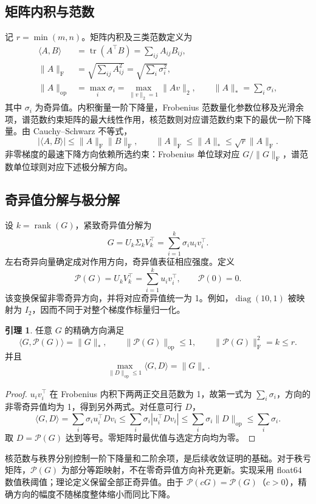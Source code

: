 \documentclass[11pt,a4paper]{article}
\theoremstyle{definition}
\newtheorem{lemma}{引理}
\newcommand{\F}{\mathrm{F}}
\newcommand{\op}{\mathrm{op}}
\newcommand{\Pol}{\mathcal{P}}
\begin{document}
\subsection{矩阵内积与范数}
记 $r=\min(m,n)$。矩阵内积及三类范数定义为
\begin{align}
 \langle A,B\rangle&=\operatorname{tr}(A^\top B)=\sum_{ij}A_{ij}B_{ij},\\
 \|A\|_\F&=\sqrt{\sum_{ij}A_{ij}^2}=\sqrt{\sum_i\sigma_i^2},\\
 \|A\|_\op&=\max_i\sigma_i=\max_{\|v\|_2=1}\|Av\|_2,\qquad
 \|A\|_*=\sum_i\sigma_i,
\end{align}
其中 $\sigma_i$ 为奇异值。内积衡量一阶下降量，Frobenius 范数量化参数位移及光滑余项，谱范数约束矩阵的最大线性作用，核范数则对应谱范数约束下的最优一阶下降量。由 Cauchy--Schwarz 不等式，
\begin{equation}
 |\langle A,B\rangle|\le\|A\|_\F\|B\|_\F,
 \qquad \|A\|_\F\le\|A\|_*\le\sqrt r\|A\|_\F.
 \label{eq:norms}
\end{equation}
非零梯度的最速下降方向依赖所选约束：Frobenius 单位球对应 $G/\|G\|_\F$，谱范数单位球则对应下述极分解方向。

\subsection{奇异值分解与极分解}
设 $k=\operatorname{rank}(G)$，紧致奇异值分解为
\[
 G=U_k\Sigma_kV_k^\top=\sum_{i=1}^k\sigma_i u_iv_i^\top.
\]
左右奇异向量确定成对作用方向，奇异值表征相应强度。定义
\begin{equation}
 \Pol(G)=U_kV_k^\top=\sum_{i=1}^k u_iv_i^\top,\qquad \Pol(0)=0.
 \label{eq:polar}
\end{equation}
该变换保留非零奇异方向，并将对应奇异值统一为 1。例如，$\operatorname{diag}(10,1)$ 被映射为 $I_2$，因而不同于对整个梯度作标量归一化。

\begin{lemma}
任意 $G$ 的精确方向满足
\begin{equation}
 \langle G,\Pol(G)\rangle=\|G\|_*,\qquad
 \|\Pol(G)\|_\op\le1,\qquad
 \|\Pol(G)\|_\F^2=k\le r.
 \label{eq:polar-identities}
\end{equation}
并且
\begin{equation}
 \max_{\|D\|_\op\le1}\langle G,D\rangle=\|G\|_*.
 \label{eq:duality}
\end{equation}
\end{lemma}
\begin{proof}
$u_i v_i^\top$ 在 Frobenius 内积下两两正交且范数为 1，故第一式为 $\sum_i\sigma_i$，方向的非零奇异值均为 1，得到另外两式。对任意可行 $D$，
\[
 \langle G,D\rangle=\sum_i\sigma_i u_i^\top Dv_i
 \le\sum_i\sigma_i|u_i^\top Dv_i|
 \le\sum_i\sigma_i\|D\|_\op\le\sum_i\sigma_i.
\]
取 $D=\Pol(G)$ 达到等号。零矩阵时最优值与选定方向均为零。
\end{proof}
核范数与秩界分别控制一阶下降量和二阶余项，是后续收敛证明的基础。对于秩亏矩阵，$\Pol(G)$ 为部分等距映射，不在零奇异值方向补充更新。实现采用 float64 数值秩阈值；理论定义保留全部正奇异值。由于 $\Pol(cG)=\Pol(G)$（$c>0$），精确方向的幅度不随梯度整体缩小而同比下降。
\end{document}
